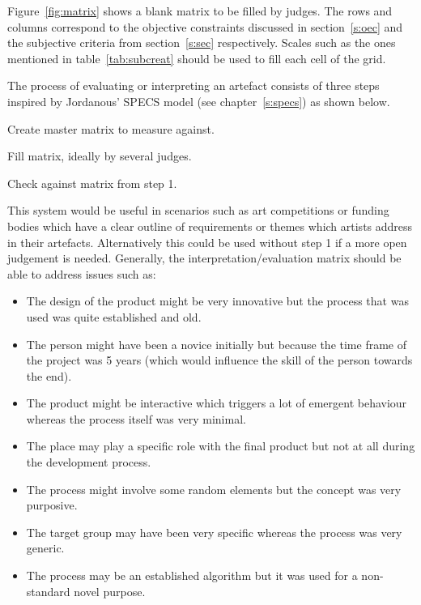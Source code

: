 Figure~\ref{fig:matrix} shows a blank matrix to be filled by judges. The rows and columns correspond to the objective constraints discussed in section~\ref{s:oec} and the subjective criteria from section~\ref{s:sec} respectively. Scales such as the ones mentioned in table~\ref{tab:subcreat} should be used to fill each cell of the grid. 

The process of evaluating or interpreting an artefact consists of three steps inspired by Jordanous' \ac{SPECS} model (see chapter~\ref{s:specs}) as shown below.

\begin{description}[leftmargin=2cm]
  \item[Step 1] Create master matrix to measure against.
  \item[Step 2] Fill matrix, ideally by several judges.
  \item[Step 3] Check against matrix from step 1.
\end{description}

This system would be useful in scenarios such as art competitions or funding bodies which have a clear outline of requirements or themes which artists address in their artefacts. Alternatively this could be used without step 1 if a more open judgement is needed. Generally, the interpretation/evaluation matrix should be able to address issues such as:

\begin{itemize}
  \item The design of the product might be very innovative but the process that was used was quite established and old.
  \item The person might have been a novice initially but because the time frame of the project was \num{5} years (which would influence the skill of the person towards the end).
  \item The product might be interactive which triggers a lot of emergent behaviour whereas the process itself was very minimal.
  \item The place may play a specific role with the final product but not at all during the development process.
  \item The process might involve some random elements but the concept was very purposive.
  \item The target group may have been very specific whereas the process was very generic.
  \item The process may be an established algorithm but it was used for a non-standard novel purpose.
\end{itemize}



